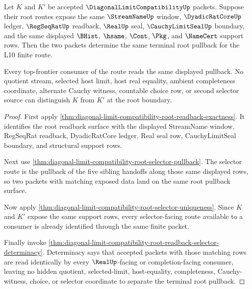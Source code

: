 \begin{theorem}
\label{thm:diagonal-limit-compatibility-four-face-terminal-pullback}
Let $K$ and $K'$ be accepted $\DiagonalLimitCompatibilityUp$ packets. Suppose their root routes expose the same $\StreamNameUp$ window, $\DyadicRatCoreUp$ ledger, $\RegSeqRatUp$ readback, $\RealUp$ seal, $\CauchyLimitSealUp$ boundary, and the same displayed $\BHist$, $\hsame$, $\Cont$, $\Pkg$, and $\NameCert$ support rows. Then the two packets determine the same terminal root pullback for the L10 finite route.

Every top-frontier consumer of the route reads the same displayed pullback. No quotient stream, selected host limit, host real equality, ambient completeness coordinate, alternate Cauchy witness, countable choice row, or second selector source can distinguish $K$ from $K'$ at the root boundary.
\end{theorem}
\begin{proof}
First apply \autoref{thm:diagonal-limit-compatibility-root-readback-exactness}. It identifies the root readback surface with the displayed StreamName window, RegSeqRat readback, DyadicRatCore ledger, Real seal row, CauchyLimitSeal boundary, and structural support rows.

Next use \autoref{thm:diagonal-limit-compatibility-root-selector-pullback}. The selector route is the pullback of the five sibling handoffs along those same displayed rows, so two packets with matching exposed data land on the same root pullback surface.

Now apply \autoref{thm:diagonal-limit-compatibility-root-selector-uniqueness}. Since $K$ and $K'$ expose the same support rows, every selector-facing route available to a consumer is already identified through the same finite packet.

Finally invoke \autoref{thm:diagonal-limit-compatibility-root-readback-selector-determinacy}. Determinacy says that accepted packets with those matching rows are read identically by every $\RealUp$-facing or completion-facing consumer, leaving no hidden quotient, selected-limit, host-equality, completeness, Cauchy-witness, choice, or selector coordinate to separate the terminal root pullback.
\end{proof}

